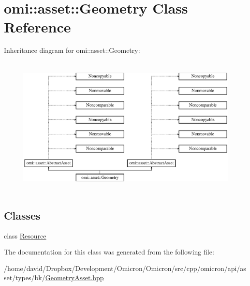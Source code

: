 \hypertarget{classomi_1_1asset_1_1_geometry}{}\section{omi\+:\+:asset\+:\+:Geometry Class Reference}
\label{classomi_1_1asset_1_1_geometry}
Inheritance diagram for omi\+:\+:asset\+:\+:Geometry\+:\begin{figure}[H]
\begin{center}
\leavevmode
\includegraphics[height=7.088607cm]{classomi_1_1asset_1_1_geometry}
\end{center}
\end{figure}
\subsection*{Classes}
\begin{DoxyCompactItemize}
\item 
class \hyperlink{classomi_1_1asset_1_1_geometry_1_1_resource}{Resource}
\end{DoxyCompactItemize}


The documentation for this class was generated from the following file\+:\begin{DoxyCompactItemize}
\item 
/home/david/\+Dropbox/\+Development/\+Omicron/\+Omicron/src/cpp/omicron/api/asset/types/bk/\hyperlink{_geometry_asset_8hpp}{Geometry\+Asset.\+hpp}\end{DoxyCompactItemize}
